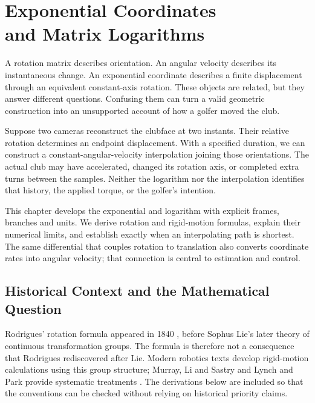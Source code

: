 \chapter[Exponential Coordinates and Matrix Logarithms]{Exponential Coordinates\\and Matrix Logarithms}
\label{ch:exponential_coordinates}

A rotation matrix describes orientation. An angular velocity describes its instantaneous change. An exponential coordinate describes a finite displacement through an equivalent constant-axis rotation. These objects are related, but they answer different questions. Confusing them can turn a valid geometric construction into an unsupported account of how a golfer moved the club.

Suppose two cameras reconstruct the clubface at two instants. Their relative rotation determines an endpoint displacement. With a specified duration, we can construct a constant-angular-velocity interpolation joining those orientations. The actual club may have accelerated, changed its rotation axis, or completed extra turns between the samples. Neither the logarithm nor the interpolation identifies that history, the applied torque, or the golfer's intention.

This chapter develops the exponential and logarithm with explicit frames, branches and units. We derive rotation and rigid-motion formulas, explain their numerical limits, and establish exactly when an interpolating path is shortest. The same differential that couples rotation to translation also converts coordinate rates into angular velocity; that connection is central to estimation and control.

\section{Historical Context and the Mathematical Question}
\label{sec:historical_context_lie}
\label{laymans:context_box}

Rodrigues' rotation formula appeared in 1840 \cite{rodrigues1840}, before Sophus Lie's later theory of continuous transformation groups. The formula is therefore not a consequence that Rodrigues rediscovered after Lie. Modern robotics texts develop rigid-motion calculations using this group structure; Murray, Li and Sastry and Lynch and Park provide systematic treatments \cite{Murray1994,Lynch2017}. The derivations below are included so that the conventions can be checked without relying on historical priority claims.

